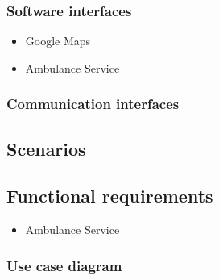 \documentclass{article}
\begin{document}
\subsubsection{Software interfaces}
\begin{itemize}
	\item Google Maps
	\item Ambulance Service
\end{itemize}
\subsubsection{Communication interfaces}
\subsection{Scenarios}
\subsection{Functional requirements}
\begin{itemize}
	\item Ambulance Service
\end{itemize}
\subsubsection{Use case diagram}
\end{document}
